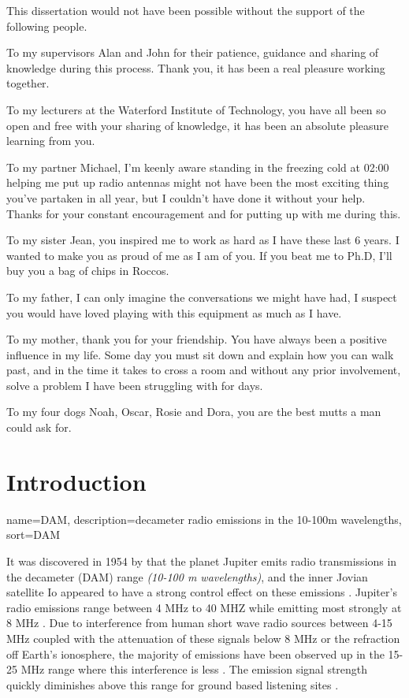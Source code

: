 \documentclass[runningheads,a4paper]{llncs}
\begin{document}
This dissertation would not have been possible without the support of the following people.

To my supervisors Alan and John for their patience, guidance and sharing of knowledge during this process. Thank you, it has been a real pleasure working together.

To my lecturers at the Waterford Institute of Technology, you have all been so open and free with your sharing of knowledge, it has been an absolute pleasure learning from you.

To my partner Michael, I'm keenly aware standing in the freezing cold at 02:00 helping me put up radio antennas might not have been the most exciting thing you've partaken in all year, but I couldn't have done it without your help. Thanks for your constant encouragement and for putting up with me during this. 

To my sister Jean, you inspired me to work as hard as I have these last 6 years. I wanted to make you as proud of me as I am of you. If you beat me to Ph.D, I'll buy you a bag of chips in Roccos.

To my father, I can only imagine the conversations we might have had, I suspect you would have loved playing with this equipment as much as I have.

To my mother, thank you for your friendship. You have always been a positive influence in my life. Some day you must sit down and explain how you can walk past, and in the time it takes to cross a room and without any prior involvement, solve a problem I have been struggling with for days.

To my four dogs Noah, Oscar, Rosie and Dora, you are the best mutts a man could ask for.

\newpage
\tableofcontents
%
\renewcommand*{\glsclearpage}{}
\printglossaries
%
\newpage
\listoffigures
{}
\newpage
\listoftables
{}
%
\newpage
\chapter*{Introduction}

%
{
  name={DAM},
  description={decameter radio emissions in the 10-100m wavelengths},
  sort=DAM
}
%

It was discovered in 1954 by \cite{burke55} that the planet Jupiter emits radio transmissions in the decameter (\gls{DAM}) range \textit{(10-100 m wavelengths)}, and the inner Jovian satellite Io appeared to have a strong control effect on these emissions \citep{belcher87}. Jupiter's radio emissions range between 4 MHz to 40 MHZ while emitting most strongly at 8 MHz  \citep{wilkinson94}. Due to interference from human short wave radio sources between 4-15 MHz coupled with the attenuation of these signals below 8 MHz or the refraction off Earth's ionosphere, the majority of emissions have been observed up in the 15-25 MHz range where this interference is less \citep{wilkinson94}. The emission signal strength quickly diminishes above this range for ground based listening sites \citep{wilkinson94}.
\end{document}
